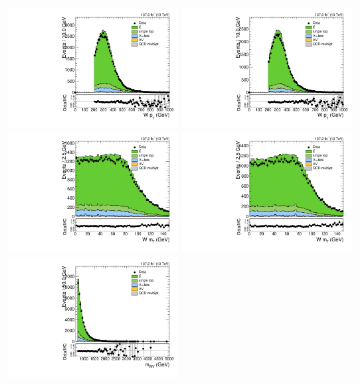 \begin{figure}[htbp]
  \centering
  \includegraphics[width=0.4\textwidth]{fig/analysis/CR_b1_mu_allP_allC_allE_Run2_lnujj_l1_pt.pdf}
  \includegraphics[width=0.4\textwidth]{fig/analysis/CR_b1_e_allP_allC_allE_Run2_lnujj_l1_pt.pdf}\\
  \includegraphics[width=0.4\textwidth]{fig/analysis/CR_b1_mu_allP_allC_allE_Run2_lnujj_l1_mt.pdf}
  \includegraphics[width=0.4\textwidth]{fig/analysis/CR_b1_e_allP_allC_allE_Run2_lnujj_l1_mt.pdf}\\
  \includegraphics[width=0.4\textwidth]{fig/analysis/CR_b1_mu_allP_allC_allE_Run2_mWV.pdf}

\end{figure}
